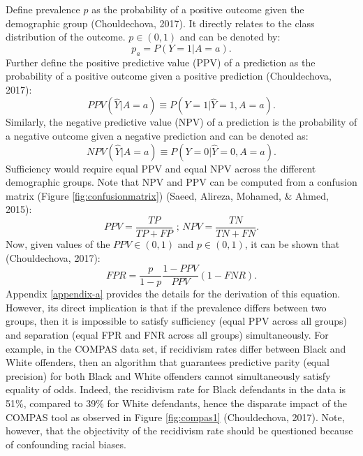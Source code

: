 \documentclass[12pt, twoside]{amherstthesis}
\begin{document}
Define prevalence \(p\) as the probability of a positive outcome given the demographic group (Chouldechova, 2017). It directly relates to the class distribution of the outcome. \(p \in (0,1)\) and can be denoted by:
\begin{equation}
\label{ch1eq14}
p_a = P(Y=1|A=a).
\end{equation}
Further define the positive predictive value (PPV) of a prediction as the probability of a positive outcome given a positive prediction (Chouldechova, 2017):
\begin{equation}
\label{ch1eq15}
PPV(\hat{Y}|A = a) \equiv P (Y = 1| \hat{Y} = 1, A = a).
\end{equation}
Similarly, the negative predictive value (NPV) of a prediction is the probability of a negative outcome given a negative prediction and can be denoted as:
\begin{equation}
\label{ch1eq16}
NPV(\hat{Y}|A = a) \equiv P (Y = 0| \hat{Y} = 0, A = a).
\end{equation}
Sufficiency would require equal PPV and equal NPV across the different demographic groups. Note that NPV and PPV can be computed from a confusion matrix (Figure \ref{fig:confusionmatrix}) (Saeed, Alireza, Mohamed, \& Ahmed, 2015):
\begin{equation}
\label{ch1eq17}
PPV = \frac{TP}{TP + FP} \text{   ;   } NPV = \frac{TN}{TN + FN}.
\end{equation}
Now, given values of the \(PPV \in (0,1)\) and \(p \in (0,1)\), it can be shown that (Chouldechova, 2017):
\begin{equation}
\label{ch1eq18}
FPR = \frac{p}{1-p} \frac{1-PPV}{PPV}(1 - FNR).
\end{equation}
Appendix \ref{appendix-a} provides the details for the derivation of this equation. However, its direct implication is that if the prevalence differs between two groups, then it is impossible to satisfy sufficiency (equal PPV across all groups) and separation (equal FPR and FNR across all groups) simultaneously. For example, in the COMPAS data set, if recidivism rates differ between Black and White offenders, then an algorithm that guarantees predictive parity (equal precision) for both Black and White offenders cannot simultaneously satisfy equality of odds. Indeed, the recidivism rate for Black defendants in the data is 51\%, compared to 39\% for White defendants, hence the disparate impact of the COMPAS tool as observed in Figure \ref{fig:compas1} (Chouldechova, 2017). Note, however, that the objectivity of the recidivism rate should be questioned because of confounding racial biases.
\end{document}
